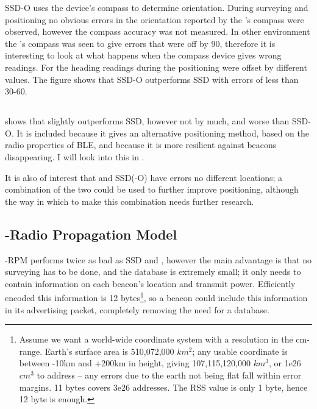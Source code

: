 SSD-O uses the device's compass to determine orientation.
During surveying and positioning no obvious errors in the orientation reported by the \device's compass were observed, however the compass accuracy was not measured.
In other environment the \device's compass was seen to give errors that were off by 90\textdegree, therefore it is interesting to look at what happens when the compass device gives wrong readings.
For  the heading readings during the positioning were offset by different values.
The figure shows that SSD-O outperforms SSD with errors of less than 30-60\textdegree.

\subsection{\BRP}
 shows that \aBRP slightly outperforms SSD, however not by much, and worse than SSD-O.
It is included because it gives an alternative positioning method, based on the radio properties of BLE, and because it is more resilient against beacons disappearing.
I will look into this in .

It is also of interest that \aBRP and SSD(-O) have errors no different locations; a combination of the two could be used to further improve positioning, although the way in which to make this combination needs further research.

\subsection{\BRP-Radio Propagation Model}
\aBRP-RPM performs twice as bad as SSD and \aBRP, however the main advantage is that no surveying has to be done, and the database is extremely small; it only needs to contain information on each beacon's location and transmit power.
Efficiently encoded this information is 12 bytes\footnote{
    Assume we want a world-wide coordinate system with a resolution in the cm-range.
    Earth's surface area is 510,072,000 $km^2$; any usable coordinate is between -10km and +200km in height, giving 107,115,120,000 $km^3$, or 1e26 $cm^3$ to address -- any errors due to the earth not being flat fall within error margins.
    11 bytes covers 3e26 addresses.
    The RSS value is only 1 byte, hence 12 byte is enough.
}, so a beacon could include this information in its advertising packet, completely removing the need for a database.



